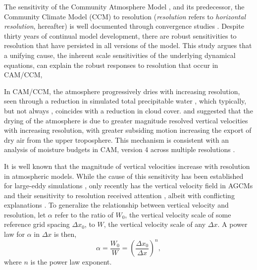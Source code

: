 \documentclass[times]{qjrms4}
\begin{document}
The sensitivity of the Community Atmosphere Model \citep[CAM;][]{CAM5}, and its predecessor, the Community Climate Model (CCM) to resolution ({\em{resolution}} refers to {\em{horizontal resolution}}, hereafter) is well documented through convergence studies \citep{KW1991JGR,WETAL1995CD,W2008TELLUS,RETAL2013JCLIM,ZetAl2014JCb,HR2017JCLIM}. Despite thirty years of continual model development, there are robust sensitivities to resolution that have persisted in all versions of the model. This study argues that a unifying cause, the inherent scale sensitivities of the underlying dynamical equations, can explain the robust responses to resolution that occur in CAM/CCM, {\color{red}{since it is difficult to conceive that inevitable responses to native grid resolution could be ignored in the pursuit of scale-aware physics.}}

In CAM/CCM, the atmosphere progressively dries with increasing resolution, seen through a reduction in simulated total precipitable water \citep{KW1991JGR,WETAL1995CD,W2008TELLUS,RETAL2013JCLIM,ZetAl2014JCb,HR2017JCLIM}, which typically, but not always \citep[see][]{WETAL1995CD,ZetAl2014JCb}, coincides with a reduction in cloud cover. \cite{KW1991JGR} and \cite{WETAL1995CD} suggested that the drying of the atmosphere is due to greater magnitude resolved vertical velocities with increasing resolution, with greater subsiding motion increasing the export of dry air from the upper troposphere. This mechanism is consistent with an analysis of moisture budgets in CAM, version 4 \citep[CAM4;][]{CAM4} across multiple resolutions \citep{YETAL2014JCLIM,HR2017JCLIM}.

It is well known that the magnitude of vertical velocities increase with resolution in atmospheric models. While the cause of this sensitivity has been established for large-eddy simulations \citep[see][and references therein]{J2017JAMES}, only recently has the vertical velocity field in AGCMs and their sensitivity to resolution received attention \citep{DETALA2016ACP,OETAL2016JAMES}, albeit with conflicting explanations \citep{RETAL2016CD,HR2018JAMES}. To generalize the relationship between vertical velocity and resolution, let $\alpha$ refer to the ratio of $W_0$, the vertical velocity scale of some reference grid spacing $\Delta x_0$, to $W$, the vertical velocity scale of any $\Delta x$. A power law for $\alpha$ in $\Delta x$ is then,
\begin{equation}
\alpha = \frac{W_0}{W} = \left( \frac{\Delta x_0}{\Delta x} \right)^n, \label{eq:alpha}
\end{equation}
where $n$ is the power law exponent. 
\end{document}
